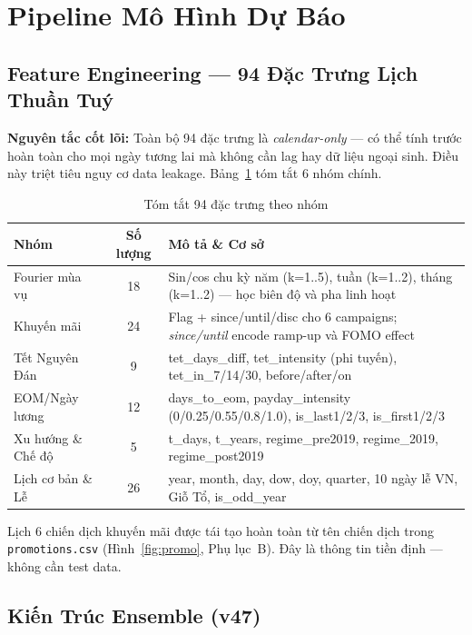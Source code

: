 \documentclass{article}
\begin{document}
\section{Pipeline Mô Hình Dự Báo}

\subsection{Feature Engineering — 94 Đặc Trưng Lịch Thuần Tuý}

\textbf{Nguyên tắc cốt lõi:} Toàn bộ 94 đặc trưng là \textit{calendar-only} — có thể tính trước hoàn toàn cho mọi ngày tương lai mà không cần lag hay dữ liệu ngoại sinh. Điều này triệt tiêu nguy cơ data leakage. Bảng~\ref{tab:features} tóm tắt 6 nhóm chính.

\begin{table}[h!]
\centering
\caption{Tóm tắt 94 đặc trưng theo nhóm}
\label{tab:features}
\small
\setlength{\tabcolsep}{4pt}
\begin{tabular}{lcp{5.8cm}}
\toprule
\textbf{Nhóm} & \textbf{Số lượng} & \textbf{Mô tả \& Cơ sở} \\
\midrule
Fourier mùa vụ  & 18 & Sin/cos chu kỳ năm (k=1..5), tuần (k=1..2), tháng (k=1..2) — học biên độ và pha linh hoạt \\
Khuyến mãi      & 24 & Flag + since/until/disc cho 6 campaigns; \textit{since/until} encode ramp-up và FOMO effect \\
Tết Nguyên Đán  &  9 & tet\_days\_diff, tet\_intensity (phi tuyến), tet\_in\_7/14/30, before/after/on \\
EOM/Ngày lương  & 12 & days\_to\_eom, payday\_intensity (0/0.25/0.55/0.8/1.0), is\_last1/2/3, is\_first1/2/3 \\
Xu hướng \& Chế độ &  5 & t\_days, t\_years, regime\_pre2019, regime\_2019, regime\_post2019 \\
Lịch cơ bản \& Lễ & 26 & year, month, day, dow, doy, quarter, 10 ngày lễ VN, Giỗ Tổ, is\_odd\_year \\
\bottomrule
\end{tabular}
\end{table}

Lịch 6 chiến dịch khuyến mãi được tái tạo hoàn toàn từ tên chiến dịch trong \texttt{promotions.csv} (Hình~\ref{fig:promo}, Phụ lục~B). Đây là thông tin tiền định — không cần test data.

\subsection{Kiến Trúc Ensemble (v47)}
\end{document}
